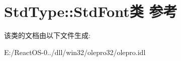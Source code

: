 \hypertarget{class_std_type_1_1_std_font}{}\section{Std\+Type\+:\+:Std\+Font类 参考}
\label{class_std_type_1_1_std_font}


该类的文档由以下文件生成\+:\begin{DoxyCompactItemize}
\item 
E\+:/\+React\+O\+S-\/0../dll/win32/olepro32/olepro.\+idl\end{DoxyCompactItemize}
